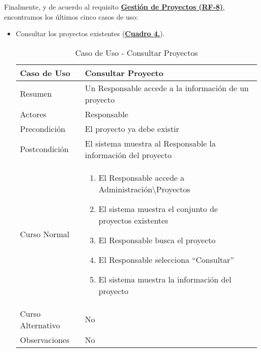 \pagebreak
Finalmente, y de acuerdo al requisito \textbf{\hyperref[tab:rfGestProyectos]{Gestión de Proyectos (RF-8)}}, encontramos los últimos cinco casos de uso:
\begin{itemize}
	\item \addtocounter{tabla}{1} Consultar los proyectos existentes (\textbf{\hyperref[tab:curConsultarProyectos]{Cuadro 4.}}).
		\begin{table}[!htbp]
		  \centering  \addtocounter{casouso}{1}
		  \begin{tabular}{|l | p{100mm}|}
		    \textbf{Caso de Uso}  & \textbf{Consultar Proyecto} \\ \hline
		    Resumen 		 & Un Responsable accede a la información de un proyecto \\ \hline
		    Actores  		 & Responsable \\ \hline
		    Precondición  	 & El proyecto ya debe existir \\ \hline
		    Postcondición  	 & El sistema muestra al Responsable la información del proyecto \\ \hline
		    Curso Normal   	 & \begin{enumerate}
			  \item El Responsable accede a Administración\textbackslash Proyectos
			  \item El sistema muestra el conjunto de proyectos existentes
			  \item El Responsable busca el proyecto
			  \item El Responsable selecciona ``Consultar''
			  \item El sistema muestra la información del proyecto
		    \end{enumerate}  \\ \hline
		    Curso Alternativo  & No  \\ \hline
		    Observaciones 	 & No  \\ \hline
		  \end{tabular}
		  \caption{Caso de Uso  - Consultar Proyectos}
		  \label{tab:curConsultarProyectos}
		\end{table}
		\FloatBarrier


\end{itemize}
